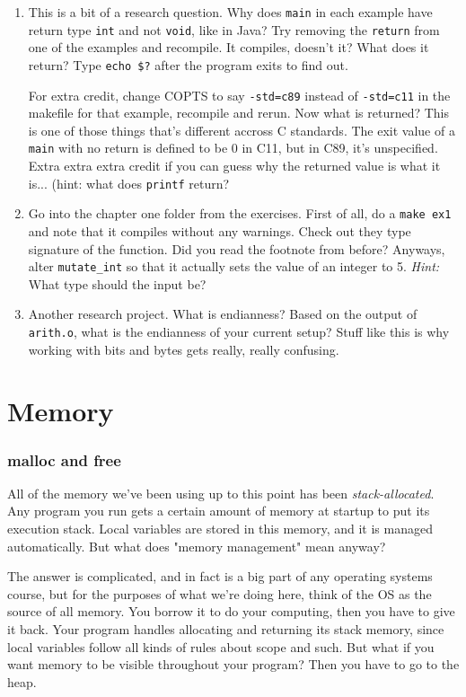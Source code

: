 \documentclass[ebook,11pt,oneside,openany]{memoir}
\newcommand{\cf}[1]{\texttt{#1}}
\begin{document}
\begin{enumerate}
\item This is a bit of a research question. Why does \texttt{main} in each example have return type \texttt{int} and not \texttt{void}, like in Java? Try removing the \texttt{return} from one of the examples and recompile.  It compiles, doesn't it? What does it return? Type \texttt{echo \$?} after the program exits to find out.

For extra credit, change COPTS to say \texttt{-std=c89} instead of \cf{-std=c11} in the makefile for that example, recompile and rerun. Now what is returned? This is one of those things that's different accross C standards. The exit value of a \texttt{main} with no return is defined to be 0 in C11, but in C89, it's unspecified. Extra extra extra credit if you can guess why the returned value is what it is... (hint: what does \cf{printf} return?

\item Go into the chapter one folder from the exercises. First of all, do a \texttt{make ex1} and note that it compiles without any warnings. Check out they type signature of the function. Did you read the footnote from before? Anyways, alter \texttt{mutate\_int} so that it actually sets the value of an integer to 5. \textit{Hint:} What type should the input be?

\item Another research project. What is endianness? Based on the output of \texttt{arith.o}, what is the endianness of your current setup? Stuff like this is why working with bits and bytes gets really, really confusing.
\end{enumerate}


\chapter{Memory}
\subsection{malloc and free}
All of the memory we've been using up to this point has been \textit{stack-allocated}. Any program you run gets a certain amount of memory at startup to put its execution stack. Local variables are stored in this memory, and it is managed automatically. But what does "memory management" mean anyway? 

The answer is complicated, and in fact is a big part of any operating systems course, but for the purposes of what we're doing here, think of the OS as the source of all memory. You borrow it to do your computing, then you have to give it back. Your program handles allocating and returning its stack memory, since local variables follow all kinds of rules about scope and such. But what if you want memory to be visible throughout your program? Then you have to go to the heap.
\end{document}
